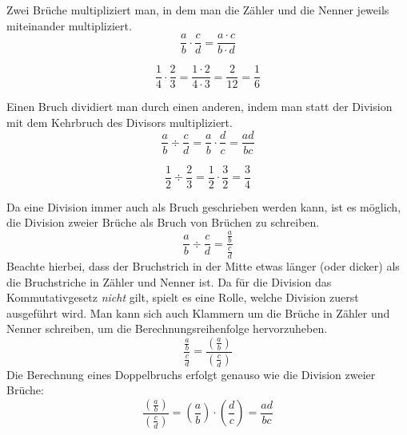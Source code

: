 \begin{regel}\label{reg:mulfrac}
 Zwei Brüche multipliziert man, in dem man die Zähler und die Nenner jeweils miteinander multipliziert.
 \begin{equation*}
  \frac{a}{b}\cdot\frac{c}{d} = \frac{a\cdot c}{b\cdot d}
 \end{equation*}

\begin{bsp}
 \begin{equation*}
  \frac{1}{4}\cdot \frac{2}{3} = \frac{1\cdot 2}{4\cdot 3} = \frac{2}{12} = \frac{1}{6}
 \end{equation*}
\end{bsp}
 
 
\end{regel}

\begin{regel}
 Einen Bruch dividiert man durch einen anderen, indem man statt der Division mit dem Kehrbruch des Divisors multipliziert.
 \begin{equation*}
  \frac{a}{b}\div\frac{c}{d} = \frac{a}{b}\cdot \frac{d}{c} = \frac{ad}{bc}
 \end{equation*}
\end{regel}

\begin{bsp}
 \begin{equation*}
  \frac{1}{2}\div \frac{2}{3} = \frac{1}{2}\cdot \frac{3}{2} = \frac{3}{4}
 \end{equation*}
\end{bsp}

\begin{beme}[Doppelbruch]
 Da eine Division immer auch als Bruch geschrieben werden kann, ist es möglich, die Division zweier Brüche als Bruch von Brüchen zu schreiben.
 \begin{equation*}
  \frac{a}{b}\div\frac{c}{d} = \frac{\frac{a}{b}}{\frac{c}{d}}
 \end{equation*}
 Beachte hierbei, dass der Bruchstrich in der Mitte etwas länger (oder dicker) als die Bruchstriche in Zähler und Nenner ist. Da für die Division das Kommutativgesetz \emph{nicht} gilt, spielt es eine Rolle, welche Division zuerst ausgeführt wird. Man kann sich auch Klammern um die Brüche in Zähler und Nenner schreiben, um die Berechnungsreihenfolge hervorzuheben.
 \begin{equation*}
  \frac{\frac{a}{b}}{\frac{c}{d}} = \frac{\left(\frac{a}{b}\right)}{\left(\frac{c}{d}\right)} 
 \end{equation*}
 Die Berechnung eines Doppelbruchs erfolgt genauso wie die Division zweier Brüche:
 \begin{equation*}
 \frac{\left(\frac{a}{b}\right)}{\left(\frac{c}{d}\right)}= \left(\frac{a}{b}\right) \cdot \left(\frac{d}{c}\right) = \frac{ad}{bc}
 \end{equation*}
\end{beme}

